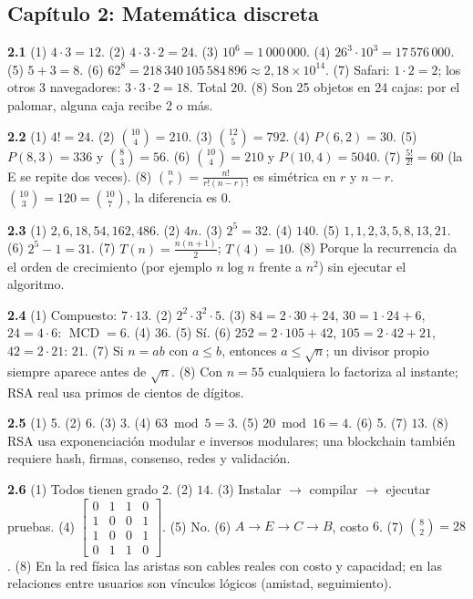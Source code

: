 \subsection*{Cap\'itulo 2: Matem\'atica discreta}
\textbf{2.1}\label{resp:2-1}\quad
(1) $4\cdot3=12$. (2) $4\cdot3\cdot2=24$. (3) $10^6=1\,000\,000$. (4) $26^3\cdot10^3=17\,576\,000$. (5) $5+3=8$. (6) $62^8=218\,340\,105\,584\,896\approx2{,}18\times10^{14}$. (7) Safari: $1\cdot2=2$; los otros 3 navegadores: $3\cdot3\cdot2=18$. Total $20$. (8) Son 25 objetos en 24 cajas: por el palomar, alguna caja recibe 2 o m\'as.

\medskip\noindent\textbf{2.2}\label{resp:2-2}\quad
(1) $4!=24$. (2) $\binom{10}4=210$. (3) $\binom{12}5=792$. (4) $P(6, 2)=30$. (5) $P(8, 3)=336$ y $\binom83=56$. (6) $\binom{10}4=210$ y $P(10, 4)=5040$. (7) $\frac{5!}{2!}=60$ (la E se repite dos veces). (8) $\binom nr=\frac{n!}{r!(n-r)!}$ es sim\'etrica en $r$ y $n-r$. $\binom{10}3=120=\binom{10}7$, la diferencia es $0$.

\medskip\noindent\textbf{2.3}\label{resp:2-3}\quad
(1) $2, 6, 18, 54, 162, 486$. (2) $4n$. (3) $2^5=32$. (4) $140$. (5) $1, 1, 2, 3, 5, 8, 13, 21$. (6) $2^5-1=31$. (7) $T(n)=\frac{n(n+1)}2$; $T(4)=10$. (8) Porque la recurrencia da el orden de crecimiento (por ejemplo $n\log n$ frente a $n^2$) sin ejecutar el algoritmo.

\medskip\noindent\textbf{2.4}\label{resp:2-4}\quad
(1) Compuesto: $7\cdot13$. (2) $2^2\cdot3^2\cdot5$. (3) $84=2\cdot30+24$, $30=1\cdot24+6$, $24=4\cdot6$: $\operatorname{MCD}=6$. (4) $36$. (5) S\'i. (6) $252=2\cdot105+42$, $105=2\cdot42+21$, $42=2\cdot21$: $21$. (7) Si $n=ab$ con $a\le b$, entonces $a\le\sqrt n$; un divisor propio siempre aparece antes de $\sqrt n$. (8) Con $n=55$ cualquiera lo factoriza al instante; RSA real usa primos de cientos de d\'igitos.

\medskip\noindent\textbf{2.5}\label{resp:2-5}\quad
(1) 5. (2) 6. (3) 3. (4) $63\bmod5=3$. (5) $20\bmod16=4$. (6) 5. (7) $13$. (8) RSA usa exponenciaci\'on modular e inversos modulares; una blockchain tambi\'en requiere hash, firmas, consenso, redes y validaci\'on.

\medskip\noindent\textbf{2.6}\label{resp:2-6}\quad
(1) Todos tienen grado 2. (2) $14$. (3) Instalar $\to$ compilar $\to$ ejecutar pruebas. (4) $\begin{bmatrix}0&1&1&0\\1&0&0&1\\1&0&0&1\\0&1&1&0\end{bmatrix}$. (5) No. (6) $A\to E\to C\to B$, costo $6$. (7) $\binom82=28$. (8) En la red f\'isica las aristas son cables reales con costo y capacidad; en las relaciones entre usuarios son v\'inculos l\'ogicos (amistad, seguimiento).

